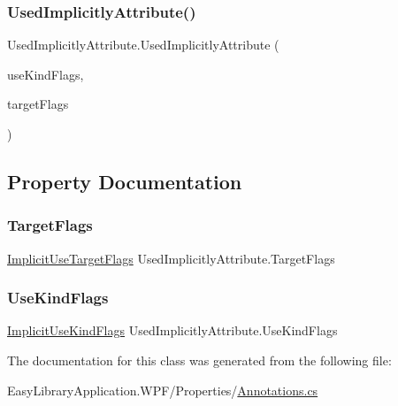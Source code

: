 \subsubsection{\texorpdfstring{Used\+Implicitly\+Attribute()}{UsedImplicitlyAttribute()}\hspace{0.1cm}{\footnotesize\ttfamily [4/4]}}
{\footnotesize\ttfamily Used\+Implicitly\+Attribute.\+Used\+Implicitly\+Attribute (\begin{DoxyParamCaption}\item[{\mbox{\hyperlink{_annotations_8cs_acc26806cec0b003502b38c6c2ee67fd1}{Implicit\+Use\+Kind\+Flags}}}]{use\+Kind\+Flags,  }\item[{\mbox{\hyperlink{_annotations_8cs_a59f21202ead30f3d1e2093e42214bf7c}{Implicit\+Use\+Target\+Flags}}}]{target\+Flags }\end{DoxyParamCaption})}



\subsection{Property Documentation}
\mbox{\label{class_used_implicitly_attribute_a2efb3586ffa41ca609769f825c07a508}} 
\subsubsection{\texorpdfstring{Target\+Flags}{TargetFlags}}
{\footnotesize\ttfamily \mbox{\hyperlink{_annotations_8cs_a59f21202ead30f3d1e2093e42214bf7c}{Implicit\+Use\+Target\+Flags}} Used\+Implicitly\+Attribute.\+Target\+Flags\hspace{0.3cm}{\ttfamily [get]}}

\mbox{\label{class_used_implicitly_attribute_a7755e382c9638ee26bc7a45584ced5ff}} 
\subsubsection{\texorpdfstring{Use\+Kind\+Flags}{UseKindFlags}}
{\footnotesize\ttfamily \mbox{\hyperlink{_annotations_8cs_acc26806cec0b003502b38c6c2ee67fd1}{Implicit\+Use\+Kind\+Flags}} Used\+Implicitly\+Attribute.\+Use\+Kind\+Flags\hspace{0.3cm}{\ttfamily [get]}}



The documentation for this class was generated from the following file\+:\begin{DoxyCompactItemize}
\item 
Easy\+Library\+Application.\+W\+P\+F/\+Properties/\mbox{\hyperlink{_annotations_8cs}{Annotations.\+cs}}\end{DoxyCompactItemize}
